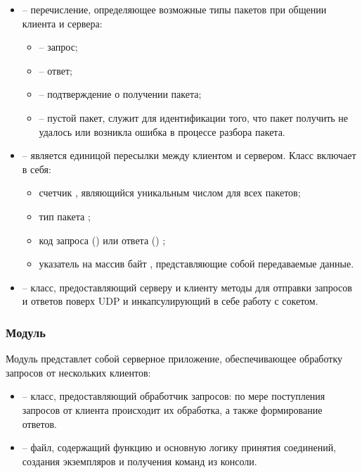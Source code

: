 \begin{itemize}
	\item {} -- перечисление, определяющее возможные типы пакетов при общении клиента и сервера:
	\begin{itemize}
		\item {} -- запрос;
		\item {} -- ответ;
		\item {} -- подтверждение о получении пакета;
		\item {} -- пустой пакет, служит для идентификации того, что пакет получить не удалось или возникла ошибка в процессе разбора пакета.
	\end{itemize}
	\item {} -- является единицой пересылки между клиентом и сервером. Класс включает в себя:
	\begin{itemize}
		\item счетчик , являющийся уникальным числом для всех пакетов;
		\item тип пакета ;
		\item код запроса () или ответа () ;
		\item указатель на массив байт , представляющие собой передаваемые данные.
	\end{itemize}
	\item {} -- класс, предоставляющий серверу и клиенту методы для отправки запросов и ответов поверх UDP и инкапсулирующий в себе работу с сокетом.
\end{itemize}

\subsubsection{Модуль }

Модуль  представлет собой серверное приложение, обеспечивающее обработку запросов от нескольких клиентов:
\begin{itemize}
	\item {} -- класс, предоставляющий обработчик запросов: по мере поступления запросов от клиента происходит их обработка, а также формирование ответов.
	\item {} -- файл, содержащий функцию  и основную логику принятия соединений, создания экземпляров  и получения команд из консоли.
\end{itemize}

